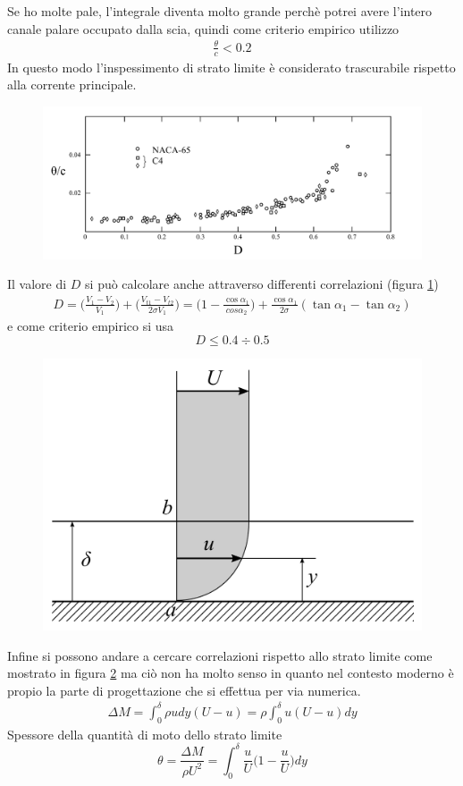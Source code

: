 Se ho molte pale, l'integrale diventa molto grande perchè potrei avere l'intero canale palare occupato dalla scia, quindi come criterio empirico utilizzo
\begin{align*}
\frac{\theta}{c} < 0.2
\end{align*}
In questo modo l'inspessimento di strato limite è considerato trascurabile rispetto alla corrente principale. 
\begin{figure}
\centering
  \includegraphics[width=\textwidth]{fig/CritCarico3.pdf}
\caption{}
\label{fig:CritCarico3}
\end{figure}
Il valore di $D$ si può calcolare anche attraverso differenti correlazioni (figura \ref{fig:CritCarico3})
\begin{align*}
D = \bigg( \frac{V_1 - V_2}{V_1} \bigg) + \bigg( \frac{V_{t1} - V_{t2}}{2 \sigma V_1} \bigg) = \bigg( 1 - \frac{\cos \alpha_1}{cos \alpha_2} \bigg) + \frac{\cos \alpha_1}{2 \sigma} (\tan \alpha_1 - \tan \alpha_2)
\end{align*}
e come criterio empirico si usa $$ D \leqslant 0.4 \div 0.5  $$
\begin{figure}
\centering
  \includegraphics[width=.4\textwidth]{fig/CritCarico4.pdf}
\caption{}
\label{fig:CritCarico4}
\end{figure}
Infine si possono andare a cercare correlazioni rispetto allo strato limite come mostrato in figura \ref{fig:CritCarico4} ma ciò non ha molto senso in quanto nel contesto moderno è propio la parte di progettazione che si effettua per via numerica. 
\begin{align*}
\Delta M = \int_0^{\delta} \rho u dy (U-u) = \rho \int_0^{\delta} u (U-u) dy
\end{align*} 
Spessore della quantità di moto dello strato limite
\begin{equation}
\theta = \frac{\Delta M}{\rho U^2} = \int_0^{\delta} \frac{u}{U} \bigg( 1 -\frac{u}{U} \bigg) dy
\end{equation}

